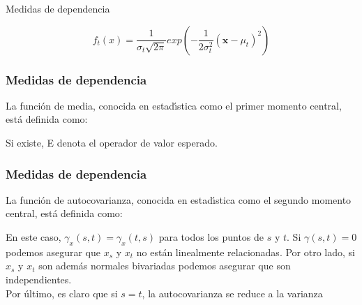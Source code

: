 \documentclass[xcolor=(list of options)]{beamer}
\begin{document}
\begin{section}{Medidas de dependencia}
\begin{frame}
\begin{equation*}
f_t(x) = \frac{1}{\sigma_t \sqrt{2 \pi}} exp  ( -  \frac{1}{2 \sigma_t^2}  (\textbf{x} - \mu_t)^2 )
\end{equation*}
\end{frame}

\begin{frame}
\frametitle{Medidas de dependencia}

La funci\'on de media, conocida en estad\'\i{}stica como el primer momento central, est\'a definida como:
\vspace{5mm}

Si existe, E denota el operador de valor esperado.

\end{frame}

\begin{frame}
\frametitle{Medidas de dependencia}

La funci\'on de autocovarianza, conocida en estad\'\i{}stica como el segundo momento central, est\'a definida como:
\vspace{5mm}

En este caso, $\gamma_{x}(s,t) = \gamma_{x}(t,s)$ para todos los puntos de $s$ y $t$. Si $\gamma(s,t)=0$ podemos asegurar que $x_s$ y $x_t$ no est\'an linealmente relacionadas. Por otro lado, si $x_s$ y $x_t$  son adem\'as normales bivariadas podemos asegurar que son independientes.
\\
Por \'ultimo, es claro que si $s = t$, la autocovarianza se reduce a la varianza


\end{frame}
\end{section}
\end{document}
